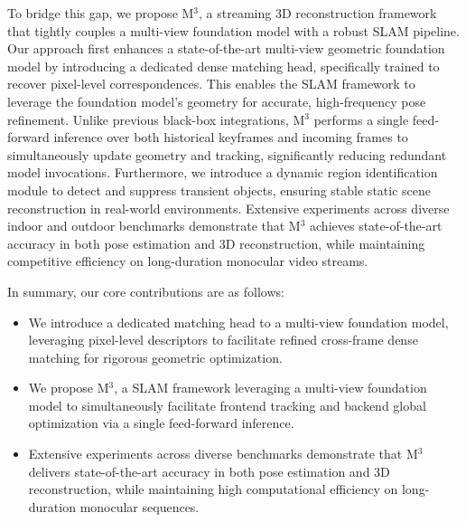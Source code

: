 To bridge this gap, we propose M$^3$, a streaming 3D reconstruction framework that tightly couples a multi-view foundation model with a robust SLAM pipeline. Our approach first enhances a state-of-the-art multi-view geometric foundation model by introducing a dedicated dense matching head, specifically trained to recover pixel-level correspondences. This enables the SLAM framework to leverage the foundation model’s geometry for accurate, high-frequency pose refinement. Unlike previous black-box integrations, M$^3$ performs a single feed-forward inference over both historical keyframes and incoming frames to simultaneously update geometry and tracking, significantly reducing redundant model invocations. Furthermore, we introduce a dynamic region identification module to detect and suppress transient objects, ensuring stable static scene reconstruction in real-world environments. Extensive experiments across diverse indoor and outdoor benchmarks demonstrate that M$^3$ achieves state-of-the-art accuracy in both pose estimation and 3D reconstruction, while maintaining competitive efficiency on long-duration monocular video streams.

In summary, our core contributions are as follows:

\begin{itemize}
    \item We introduce a dedicated matching head to a multi-view foundation model, leveraging pixel-level descriptors to facilitate refined cross-frame dense matching for rigorous geometric optimization.
    \item We propose M$^3$, a SLAM framework leveraging a multi-view foundation model to simultaneously facilitate frontend tracking and backend global optimization via a single feed-forward inference.
    \item Extensive experiments across diverse benchmarks demonstrate that M$^3$ delivers state-of-the-art accuracy in both pose estimation and 3D reconstruction, while maintaining high computational efficiency on long-duration monocular sequences.
\end{itemize}

